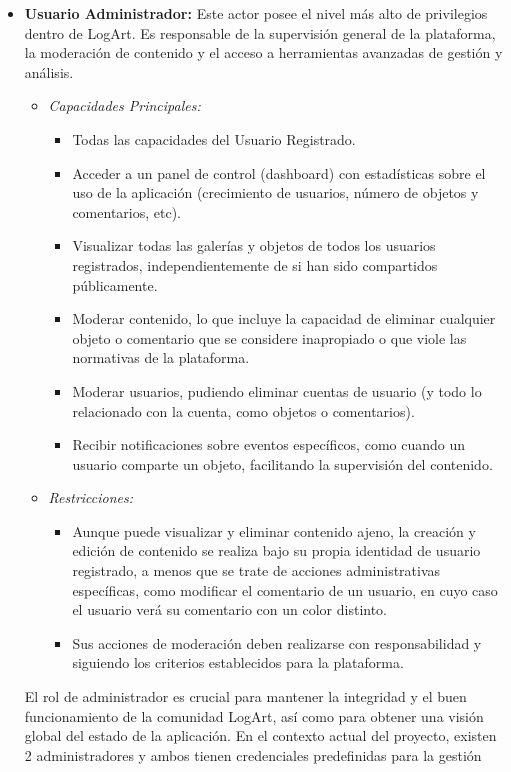 \begin{itemize}
    \item \textbf{Usuario Administrador:}
    Este actor posee el nivel más alto de privilegios dentro de LogArt. Es responsable de la supervisión general de la plataforma, la moderación de contenido y el acceso a herramientas avanzadas de gestión y análisis.
    \begin{itemize}
        \item \textit{Capacidades Principales:}
        \begin{itemize}
            \item Todas las capacidades del Usuario Registrado.
            \item Acceder a un panel de control (dashboard) con estadísticas sobre el uso de la aplicación (crecimiento de usuarios, número de objetos y comentarios, etc).
            \item Visualizar todas las galerías y objetos de todos los usuarios registrados, independientemente de si han sido compartidos públicamente.
            \item Moderar contenido, lo que incluye la capacidad de eliminar cualquier objeto o comentario que se considere inapropiado o que viole las normativas de la plataforma.
            \item Moderar usuarios, pudiendo eliminar cuentas de usuario (y todo lo relacionado con la cuenta, como objetos o comentarios).
            \item Recibir notificaciones sobre eventos específicos, como cuando un usuario comparte un objeto, facilitando la supervisión del contenido.
        \end{itemize}
    \item \textit{Restricciones:}
    \begin{itemize}
        \item Aunque puede visualizar y eliminar contenido ajeno, la creación y edición de contenido se realiza bajo su propia identidad de usuario registrado, a menos que se trate de acciones administrativas específicas, como modificar el comentario de un usuario, en cuyo caso el usuario verá su comentario con un color distinto.
        \item Sus acciones de moderación deben realizarse con responsabilidad y siguiendo los criterios establecidos para la plataforma.
    \end{itemize}
    \end{itemize}
    El rol de administrador es crucial para mantener la integridad y el buen funcionamiento de la comunidad LogArt, así como para obtener una visión global del estado de la aplicación. En el contexto actual del proyecto, existen 2 administradores y ambos tienen credenciales predefinidas para la gestión
\end{itemize}


